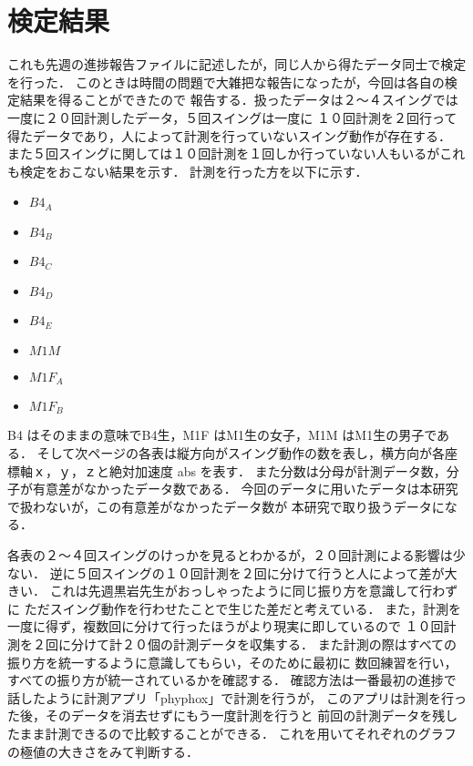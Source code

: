         \section{検定結果}

        これも先週の進捗報告ファイルに記述したが，同じ人から得たデータ同士で検定を行った．
        このときは時間の問題で大雑把な報告になったが，今回は各自の検定結果を得ることができたので
        報告する．扱ったデータは２〜４スイングでは一度に２０回計測したデータ，５回スイングは一度に
        １０回計測を２回行って得たデータであり，人によって計測を行っていないスイング動作が存在する．
        また５回スイングに関しては１０回計測を１回しか行っていない人もいるがこれも検定をおこない結果を示す．
        計測を行った方を以下に示す．
        \begin{itemize}
            \item $B4_A$
            \item $B4_B$
            \item $B4_C$
            \item $B4_D$
            \item $B4_E$
            \item $M1M$
            \item $M1F_A$
            \item $M1F_B$
        \end{itemize}

        B4 はそのままの意味でB4生，M1F はM1生の女子，M1M はM1生の男子である．
        そして次ページの各表は縦方向がスイング動作の数を表し，横方向が各座標軸ｘ，ｙ，ｚと絶対加速度 abs を表す．
        また分数は分母が計測データ数，分子が有意差がなかったデータ数である．
        今回のデータに用いたデータは本研究で扱わないが，この有意差がなかったデータ数が
        本研究で取り扱うデータになる．

        各表の２〜４回スイングのけっかを見るとわかるが，２０回計測による影響は少ない．
        逆に５回スイングの１０回計測を２回に分けて行うと人によって差が大きい．
        これは先週黒岩先生がおっしゃったように同じ振り方を意識して行わずに
        ただスイング動作を行わせたことで生じた差だと考えている．
        また，計測を一度に得ず，複数回に分けて行ったほうがより現実に即しているので
        １０回計測を２回に分けて計２０個の計測データを収集する．
        また計測の際はすべての振り方を統一するように意識してもらい，そのために最初に
        数回練習を行い，すべての振り方が統一されているかを確認する．
        確認方法は一番最初の進捗で話したように計測アプリ「phyphox」で計測を行うが，
        このアプリは計測を行った後，そのデータを消去せずにもう一度計測を行うと
        前回の計測データを残したまま計測できるので比較することができる．
        これを用いてそれぞれのグラフの極値の大きさをみて判断する．

